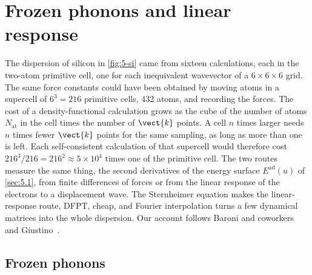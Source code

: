 \section{Frozen phonons and linear response}\label{sec:5.4}

The dispersion of silicon in \cref{fig:5-si} came from sixteen calculations, each in the two-atom primitive cell, one for each inequivalent wavevector of a $6\times6\times6$ grid. The same force constants could have been obtained by moving atoms in a supercell of $6^3 = 216$ primitive cells, 432 atoms, and recording the forces. The cost of a density-functional calculation grows as the cube of the number of atoms $N_{\mathrm{at}}$ in the cell times the number of $\vect{k}$ points. A cell $n$ times larger needs $n$ times fewer $\vect{k}$ points for the same sampling, as long as more than one is left. Each self-consistent calculation of that supercell would therefore cost $216^3/216 = 216^2 \approx 5\times10^4$ times one of the primitive cell. The two routes measure the same thing, the second derivatives of the energy surface $E^{\mathrm{ad}}(u)$ of \cref{sec:5.1}, from finite differences of forces or from the linear response of the electrons to a displacement wave. The Sternheimer equation makes the linear-response route, DFPT, cheap, and Fourier interpolation turns a few dynamical matrices into the whole dispersion. Our account follows Baroni and coworkers~\cite{baroni2001phonons} and Giustino~\cite{giustino2017electron}.

\subsection{Frozen phonons}

